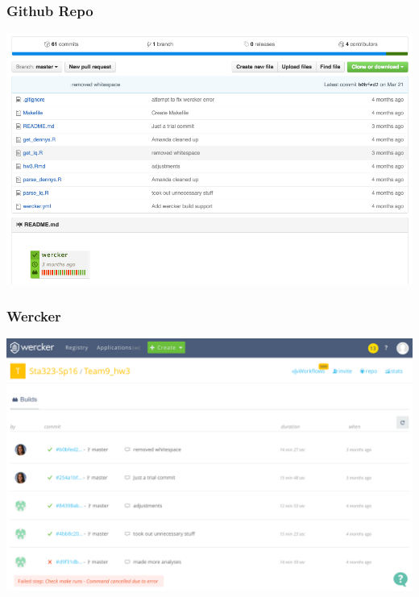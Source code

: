 \documentclass[12pt]{beamer}
\begin{document}
\begin{frame}
\frametitle{Github Repo}

\includegraphics[width=\textwidth]{imgs/github_repo.png}
    
\end{frame}


\begin{frame}
\frametitle{Wercker}

\includegraphics[width=\textwidth]{imgs/wercker_builds.png}
    
\end{frame}

\end{document}
